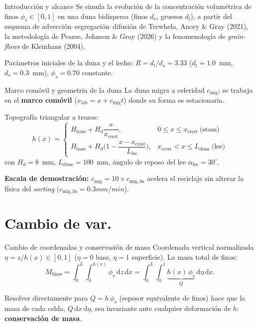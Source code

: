 \documentclass[11pt]{beamer}
\newcommand{\dd}{\mathrm{d}}
\begin{document}
\begin{frame}{Introducción y alcance}
Se simula la evolución de la concentración volumétrica de finos $\phi_s\in[0,1]$ en una duna bidispersa 
(finos $d_s$, gruesos $d_l$), a partir del esquema de advección--segregación--difusión de Trewhela, Ancey
 \& Gray (2021), la metodología de Pearse, Johnson \& Gray (2026) y la fenomenología de \emph{grain-flows} de Kleinhans (2004).

\vspace{4pt}
Parámetros iniciales de la duna y el lecho:
$R = d_l/d_s = 3.33$ ($d_l=1.0$~mm, $d_s=0.3$~mm), $\phi_s=0.70$ constante.
\end{frame}

\begin{frame}{Marco comóvil y geometría de la duna}
La duna migra a celeridad $c_{\mathrm{mig}}$; se trabaja en el \textbf{marco comóvil} 
($x_{\mathrm{lab}}=x+c_{\mathrm{mig}}t$) donde su forma es estacionaria.

\vspace{4pt}
Topografía triangular a trozos:
\begin{equation}
    h(x) = \begin{cases}
        H_{\mathrm{base}} + H_d\dfrac{x}{x_{\mathrm{crest}}}, & 0\le x \le x_{\mathrm{crest}} \ \text{(stoss)}\\[8pt]
        H_{\mathrm{base}} + H_d\Big(1-\dfrac{x-x_{\mathrm{crest}}}{L_{\mathrm{lee}}}\Big), & x_{\mathrm{crest}}<x\le L_{\mathrm{dune}} \ \text{(lee)}
    \end{cases}
\end{equation}
con $H_d=8$~mm, $L_{\mathrm{dune}}=100$~mm, ángulo de reposo del lee $\alpha_{\mathrm{lee}}=30^\circ$.

\vspace{6pt}
\textbf{Escala de demostración:} $c_{\mathrm{mig}}=10\times c_{\mathrm{mig,fis}}$ acelera el 
reciclaje sin alterar la física del \emph{sorting} ($c_{\mathrm{mig,fis}} = 0.3 mm/min$).
\end{frame}

\section{Cambio de var.}

\begin{frame}{Cambio de coordenadas y conservasión de masa}
Coordenada vertical normalizada $\eta = z/h(x)\in[0,1]$ ($\eta=0$ base, $\eta=1$ superficie). La masa total de finos:
\begin{equation}
    M_{\mathrm{finos}} = \int_0^L\!\!\int_0^{h(x)}\!\phi_s\,\dd z\,\dd x
    = \int_0^L\!\!\int_0^1 \underbrace{h(x)\,\phi_s}_{\displaystyle Q}\,\dd\eta\,\dd x .
\end{equation}

\vspace{6pt}
Resolver directamente para $Q=h\,\phi_s$ (espesor equivalente de finos) hace que la masa de cada celda, 
$Q\,\dd x\,\dd\eta$, sea invariante ante cualquier deformación de $h$: \textbf{conservación de masa}.
\end{frame}
\end{document}
